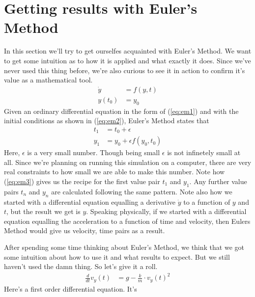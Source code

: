 \documentclass[paper=a4, fontsize=11pt]{scrartcl} %
\numberwithin{equation}{section} %
\numberwithin{figure}{section} %
\numberwithin{table}{section} %
\begin{document}
\section{Getting results with Euler's Method}
In this section we'll try to get ourselfes acquainted with Euler's Method.
We want to get some intuition as to how it is applied and what exactly it does.
Since we've never used this thing before, we're also curious to see it in action to confirm it's value as a mathematical tool.
\begin{align} 
  \dot{y} &= f(y, t) \label{eq:em1} \\
  y(t_0) &= y_0 \label{eq:em2}
\end{align}
Given an ordinary differential equation in the form of (\ref{eq:em1}) and with the initial conditions as shown in (\ref{eq:em2}), Euler's Method states that
\begin{align} \label{eq:em3}
  t_1 &= t_0 + \epsilon \\
  y_1 &= y_0 + \epsilon f(y_0, t_0)
\end{align}
Here, $\epsilon$ is a very small number. Though being small $\epsilon$ is not infinetely small at all.
Since we're planning on running this simulation on a computer, there are very real constraints to how small we are able to make this number.
Note how (\ref{eq:em3}) gives us the recipe for the first value pair $t_1$ and $y_1$. Any further value pairs $t_n$ and $y_n$ are calculated following the same pattern.
Note also how we started with a differential equation equalling a derivative $\dot{y}$ to a function of $y$ and $t$, but the result we get is $y$. Speaking physically,
if we started with a differential equation equalling the acceleration to a function of time and velocity, then Eulers Method would give us velocity, time pairs as a result.
\vspace{\baselineskip}

After spending some time thinking about Euler's Method, we think that we got some intuition about how to use it and what results
to expect. But we still haven't used the damn thing. So let's give it a roll.
\begin{align} \label{eq:10}
\frac{d}{dt} v_y(t) &= g - \frac{k}{m} \cdot v_y(t)^2
\end{align}
Here's a first order differential equation. It's 
\end{document}
